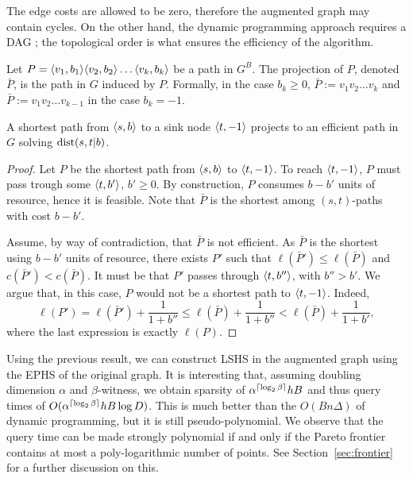 \begin{remark}
The edge costs are allowed to be zero, therefore the augmented graph may contain cycles.
On the other hand, the dynamic programming approach requires a DAG ; the topological order is what ensures the efficiency of the algorithm.
\end{remark}

\begin{definition}
Let $P=\langle v_1,b_1\rangle\langle v_2,b_2\rangle\ldots\langle v_k,b_k\rangle$ be a path in $G^B$.
The projection of $P$, denoted $\bar P$, is the path in $G$ induced by $P$. 
Formally, in the case $b_k\geq 0$, $\bar P:=v_1v_2\ldots v_k$ and $\bar P:=v_1v_2\ldots v_{k-1}$ in the case $b_k=-1$. 
\end{definition}


\begin{proposition}\label{prop:shorteffic}
A shortest path from $\langle s,b\rangle$ to a sink node $\langle t,-1\rangle$ projects to an efficient path in $G$ solving $\text{dist}(s,t|b)$. 
\end{proposition}
\begin{proof}
Let $P$ be the shortest path from $\langle s,b\rangle$ to $\langle t,-1\rangle$.
To reach $\langle t,-1\rangle$, $P$ must pass trough some $\langle t,b'\rangle$, $b'\geq 0$.
By construction, $P$ consumes $b-b'$ units of resource, hence it is feasible.
Note that $\bar P$ is the shortest among $(s,t)$-paths with cost $b-b'$.

Assume, by way of contradiction, that $\bar P$ is not efficient.
As $\bar P$ is the shortest using $b-b'$ units of resource, there exists $P'$ such that $\ell(\bar P')\leq \ell(\bar P)$ and $c(\bar P')< c(\bar P)$.
It must be that $P'$ passes through $\langle t,b''\rangle$, with $b''>b'$.
We argue that, in this case, $P$ would not be a shortest path to $\langle t,-1\rangle$.
Indeed, 
\[
\ell(P')=\ell(\bar P')+\frac{1}{1+b''}
\leq \ell(\bar P) +\frac{1}{1+b''}
< \ell(\bar P) +\frac{1}{1+b'},
\]
where the last expression is exactly $\ell(P)$.
\end{proof}

Using the previous result, we can construct LSHS in the augmented graph using the EPHS of the original graph.
It is interesting that, assuming doubling dimension $\alpha$ and $\beta$-witness, we obtain sparsity of $\alpha^{\lceil\log_2\beta\rceil} hB$ and thus query times of $O(\alpha^{\lceil\log_2\beta\rceil} hB\log D)$.
This is much better than the $O(Bn\Delta)$ of dynamic programming, but it is still pseudo-polynomial.
We observe that the query time can be made strongly polynomial if and only if the Pareto frontier contains at most a poly-logarithmic number of points.
See Section~\ref{sec:frontier} for a further discussion on this.
 
